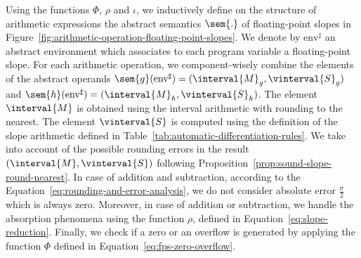 Using the functions $\Phi$, $\rho$ and $\iota$, we inductively define
on the structure of arithmetic expressions the abstract semantics
$\sem{.}$ of floating-point slopes in
Figure~\ref{fig:arithmetic-operation-floating-point-slopes}. We denote
by $\text{env}^\sharp$ an abstract environment which associates to
each program variable a floating-point slope. For each arithmetic
operation, we component-wisely combine the elements of the abstract
operands $\sem{g}(\text{env}^\sharp)=(\interval{M}_g,
\vinterval{S}_g)$ and $\sem{h}(\text{env}^\sharp)=(\interval{M}_h,
\vinterval{S}_h)$. The element $\interval{M}$ is obtained using the
interval arithmetic with rounding to the nearest. The element
$\vinterval{S}$ is computed using the definition of the slope
arithmetic defined in Table~\ref{tab:automatic-differentiation-rules}.
We take into account of the possible rounding errors in the result
$(\interval{M}, \vinterval{S})$ following
Proposition~\ref{prop:sound-slope-round-nearest}. In case of addition
and subtraction, according to the
Equation~\eqref{eq:rounding-and-error-analysis}, we do not consider
absolute error $\frac{\sigma}{2}$ which is always zero. Moreover, in
case of addition or subtraction, we handle the absorption phenomena
using the function $\rho$, defined in
Equation~\eqref{eq:slope-reduction}. Finally, we check if a zero or an
overflow is generated by applying the function $\Phi$ defined in
Equation~\eqref{eq:fps-zero-overflow}.


